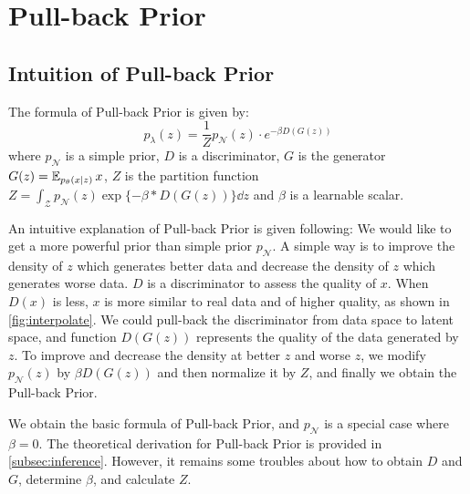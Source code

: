 
\section{Pull-back Prior}\label{sec:pull_back_prior}

\subsection{Intuition of Pull-back Prior}\label{subsec:intuition}

The formula of Pull-back Prior is given by:
\begin{equation}\label{eq:pull_back_prior}
	p_\lambda(z) = \frac{1}{Z} p_\mathcal{N}(z) \cdot e^{- \beta D(G(z))} \tag{4}
\end{equation}
where $p_\mathcal{N}$ is a simple prior, $D$ is a discriminator, $G$ is the generator $G(z) = \operatorname{\mathbb{E}}_{p_\theta(x|z)} x$, $Z$ is the partition function $Z = \int_{\mathcal{Z}} p_\mathcal{N}(z) \exp\{- \beta * D(G(z))\} \dd z$ and $\beta$ is a learnable scalar.

An intuitive explanation of Pull-back Prior is given following: We would like to get a more powerful prior than simple prior $p_\mathcal{N}$. A simple way is to improve the density of $z$ which generates better data and decrease the density of $z$ which generates worse data. $D$ is a discriminator to assess the quality of $x$. When $D(x)$ is less, $x$ is more similar to real data and of higher quality, as shown in \cref{fig:interpolate}. We could pull-back the discriminator from data space to latent space, and function $D(G(z))$ represents the quality of the data generated by $z$. To improve and decrease the density at better $z$ and worse $z$, we modify $p_\mathcal{N}(z)$ by $\beta D(G(z))$ and then normalize it by $Z$, and finally we obtain the Pull-back Prior. 

We obtain the basic formula of Pull-back Prior, and $p_\mathcal{N}$ is a special case where $\beta = 0$. The theoretical derivation for Pull-back Prior is provided in \cref{subsec:inference}. However, it remains some troubles about how to obtain $D$ and $G$, determine $\beta$, and calculate $Z$. 

